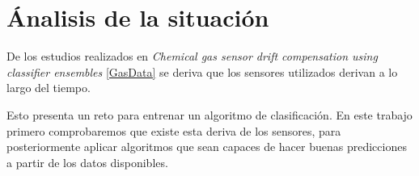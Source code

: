 \chapter{Ánalisis de la situación}

De los estudios realizados en
\emph{Chemical gas sensor drift compensation using classifier ensembles}
\ref{GasData}
se deriva que los sensores utilizados derivan a lo largo del tiempo.

Esto presenta un reto para entrenar un algoritmo de clasificación.
En este trabajo primero comprobaremos que existe esta deriva de los sensores, para posteriormente aplicar algoritmos
que sean capaces de hacer buenas predicciones a partir de los datos disponibles.


